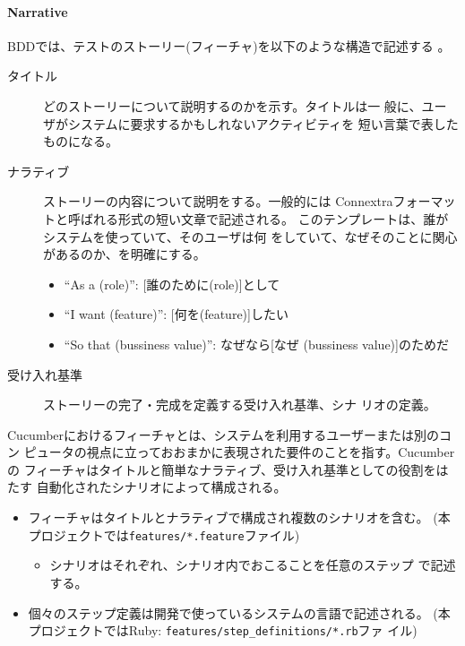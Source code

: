     \paragraph{Narrative}
BDDでは、テストのストーリー(フィーチャ)を以下のような構造で記述する
\cite{rspec-book,spiral-workflow}。
\begin{description}
 \item[タイトル] どのストーリーについて説明するのかを示す。タイトルは一
            般に、ユーザがシステムに要求するかもしれないアクティビティを
            短い言葉で表したものになる。
 \item[ナラティブ] ストーリーの内容について説明をする。一般的には
            Connextraフォーマットと呼ばれる形式の短い文章で記述される。
            このテンプレートは、誰がシステムを使っていて、そのユーザは何
            をしていて、なぜそのことに関心があるのか、を明確にする。
            \begin{itemize}
             \item ``As a (role)'': [誰のために(role)]として
             \item ``I want (feature)'': [何を(feature)]したい
             \item ``So that (bussiness value)'': なぜなら[なぜ
                   (bussiness value)]のためだ
            \end{itemize}
 \item[受け入れ基準] ストーリーの完了・完成を定義する受け入れ基準、シナ
            リオの定義。
\end{description}

Cucumberにおけるフィーチャとは、システムを利用するユーザーまたは別のコン
ピュータの視点に立っておおまかに表現された要件のことを指す。Cucumberの
フィーチャはタイトルと簡単なナラティブ、受け入れ基準としての役割をはたす
自動化されたシナリオによって構成される。
\begin{itemize}
 \item フィーチャはタイトルとナラティブで構成され複数のシナリオを含む。
       (本プロジェクトでは\verb|features/*.feature|ファイル)
       \begin{itemize}
        \item シナリオはそれぞれ、シナリオ内でおこることを任意のステップ
              で記述する。
       \end{itemize}
 \item 個々のステップ定義は開発で使っているシステムの言語で記述される。
       (本プロジェクトではRuby: \verb|features/step_definitions/*.rb|ファ
       イル)
\end{itemize}

